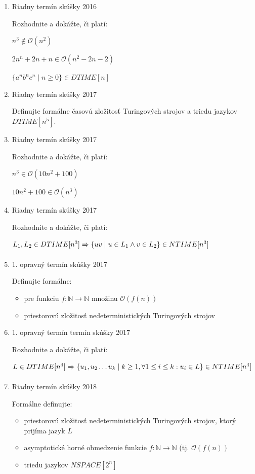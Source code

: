 \documentclass[11pt,a4paper]{article}
\begin{document}
	\begin{enumerate}
		\item Riadny termín skúšky 2016

		Rozhodnite a dokážte, či platí:

		$n^3 \notin \mathcal{O}(n^2)$

		$2n^n + 2n + n \in \mathcal{O}(n^2 - 2n - 2)$

		$\{a^nb^nc^n \mid n \geq 0\} \in DTIME[n]$

		\item Riadny termín skúšky 2017

		Definujte formálne časovú zložitosť Turingových strojov a triedu jazykov $DTIME[n^5]$.

		\item Riadny termín skúšky 2017

		Rozhodnite a dokážte, či platí:

		$n^3 \in \mathcal{O}(10n^2 + 100)$

		$10n^2 + 100 \in \mathcal{O}(n^3)$

		\item Riadny termín skúšky 2017

		Rozhodnite a dokážte, či platí:

		$L_1, L_2 \in DTIME[n^3] \xRightarrow[]{} \{ uv \mid u \in  L_1 \land v \in L_2\} \in NTIME[n^3]$

		\item 1. opravný termín skúšky 2017

		Definujte formálne:

		\begin{itemize}
			\item pre funkciu $f: \mathbb{N} \rightarrow \mathbb{N}$ množinu $\mathcal{O}(f(n))$
			\item priestorovú zložitosť nedeterministických Turingových strojov
		\end{itemize}

		\item 1. opravný termín termín skúšky 2017

		Rozhodnite a dokážte, či platí:

		$L \in DTIME[n^4] \xRightarrow[]{} \{ u_1, u_2 \ldots u_k \mid k \geq 1, \forall 1 \leq i \leq k: u_i \in L\} \in NTIME[n^4]$

		\item Riadny termín skúšky 2018

		Formálne definujte:

		\begin{itemize}
			\item priestorovú zložitosť nedeterministických Turingových strojov, ktorý prijíma jazyk $L$
			\item asymptotické horné obmedzenie funkcie $f: \mathbb{N} \rightarrow \mathbb{N}$ (tj. $\mathcal{O}(f(n))$
			\item triedu jazykov $NSPACE[2^n]$
		\end{itemize}


\end{enumerate}
\end{document}
